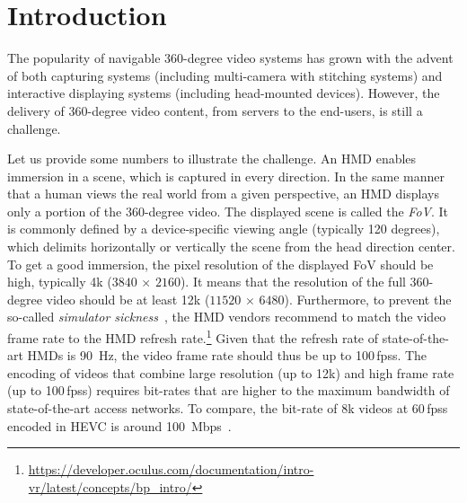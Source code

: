 \section{Introduction}
\label{sec:introduction}


The popularity of navigable 360-degree video systems
has grown with the advent of both capturing systems
(including multi-camera with stitching systems) and interactive displaying
systems (including head-mounted devices).
However, the delivery of 360-degree video content, from servers
to the end-users,
is still a challenge.

Let us provide some numbers to illustrate the challenge.
An \ac{HMD} enables immersion in a scene, which is captured in every direction.
In the same manner that a human
views the real world from a given perspective, an \ac{HMD} displays only a portion
of the 360-degree video. The displayed scene is called the \textit{\ac{FoV}}. It is commonly
defined by 
a device-specific viewing angle (typically 120 degrees), which delimits horizontally or 
vertically the scene from the head direction center. To get a good immersion, the pixel 
resolution of
the displayed \ac{FoV} should be high, typically 4k ($3840\,\times\,2160$). It means that
the resolution of the full 360-degree video should be at least 12k ($11520\,\times\,6480$). 
Furthermore, to prevent the so-called \emph{simulator sickness}~\cite{moss2011characteristics}, the \ac{HMD} 
vendors recommend to
match the video frame rate to the \ac{HMD} refresh rate.\footnote{\url{https://developer.oculus.com/documentation/intro-vr/latest/concepts/bp_intro/}} Given that the refresh rate of 
state-of-the-art \acp{HMD} is \SI{90}{Hz}, the video frame rate should thus be up to 100\,\acp{fps}.
The encoding of videos that combine large resolution (up to 12k) and high
frame rate (up to 100\,\acp{fps}) requires bit-rates that are higher to the maximum bandwidth
of state-of-the-art access networks. To compare, the bit-rate of 8k videos 
at 60\,\acp{fps} encoded in \ac{HEVC} is around \SI{100}{Mbps}~\cite{7398367}.



